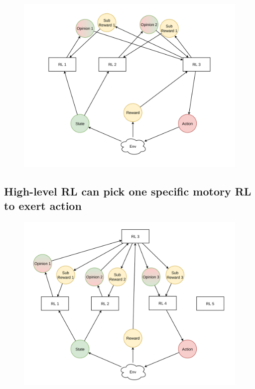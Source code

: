 \begin{figure}[h]
    \includegraphics[width=\textwidth]{images/step_2.pdf}
\end{figure}

\newpage
\subsection{High-level RL can pick one specific motory RL to exert action}

\begin{figure}[h]
    \includegraphics[width=\textwidth]{images/step_3.pdf}
\end{figure}


